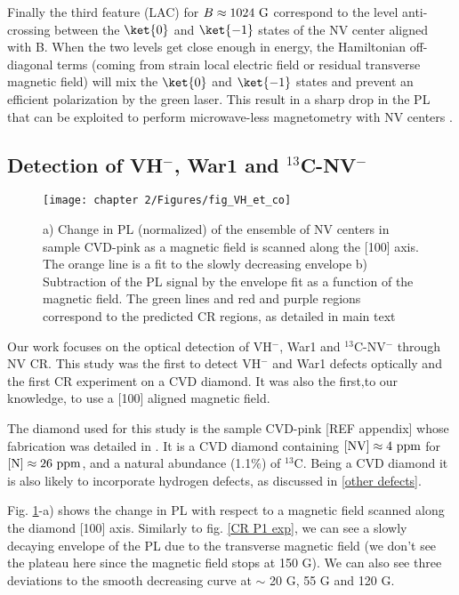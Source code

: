 \documentclass[a4paper,11pt]{report}
\begin{document}
\begin{refsection}
Finally the third feature (LAC) for $B\approx 1024 \ \rm G$ correspond to the level anti-crossing between the $\ket{0}$ and $\ket{-1}$ states of the NV center aligned with B. When the two levels get close enough in energy, the Hamiltonian off-diagonal terms (coming from strain local electric field or residual transverse magnetic field) will mix the $\ket{0}$ and $\ket{-1}$ states and prevent an efficient polarization by the green laser. This result in a sharp drop in the PL that can be exploited to perform microwave-less magnetometry with NV centers \citep{wickenbrock2016microwave, zheng2017level, zheng2020microwave}.

\subsection{Detection of VH$^-$, War1 and $^{13}$C-NV$^-$}

\begin{figure}[h]
\centering
\texttt{[image: chapter 2/Figures/fig\_VH\_et\_co]}
\caption{a) Change in PL (normalized) of the ensemble of NV centers in sample CVD-pink as a magnetic field is scanned along the [100] axis. The orange line is a fit to the slowly decreasing envelope b) Subtraction of the PL signal by the envelope fit as a function of the magnetic field. The green lines and red and purple regions correspond to the predicted CR regions, as detailed in main text}
\label{CR VH exp}
\end{figure}

Our work \citep{pellet2021optical} focuses on the optical detection of VH$^-$, War1 and $^{13}$C-NV$^-$ through NV CR. This study was the first to detect VH$^-$ and War1 defects optically and the first CR experiment on a CVD diamond. It was also the first,to our knowledge, to use a [100] aligned magnetic field.

The diamond used for this study is the sample CVD-pink [REF appendix] whose fabrication was detailed in \citep{tallaire2020high}. It is a CVD diamond containing $[\rm NV ]\approx 4\ \rm ppm$ for $[\rm N ]\approx26\ \rm ppm$, and a natural abundance (1.1\%) of  $^{13}$C. Being a CVD diamond it is also likely to incorporate hydrogen defects, as discussed in \ref{other defects}.

Fig. \ref{CR VH exp}-a) shows the change in PL with respect to a magnetic field scanned along the diamond [100] axis. Similarly to fig. \ref{CR P1 exp}, we can see a slowly decaying envelope of the PL due to the transverse magnetic field (we don't see the plateau here since the magnetic field stops at 150 G). We can also see three deviations to the smooth decreasing curve at $\sim$ 20 G, 55 G and 120 G.


\end{refsection}
\end{document}
